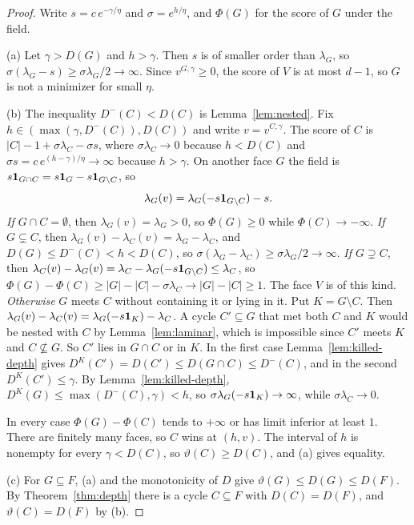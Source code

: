 \begin{proof}
Write $s=c\,e^{-\gamma/\eta}$ and $\sigma=e^{h/\eta}$, and $\Phi(G)$ for the score of
$G$ under the field.

(a) Let $\gamma>D(G)$ and $h>\gamma$. Then $s$ is of smaller order than
$\lambda_G$, so $\sigma(\lambda_G-s)\ge\sigma\lambda_G/2\to\infty$. Since
$v^{G,\gamma}\ge0$, the score of $V$ is at most $d-1$, so $G$ is not a
minimizer for small $\eta$.

(b) The inequality $D^-(C)<D(C)$ is Lemma~\ref{lem:nested}. Fix
$h\in(\max(\gamma,D^-(C)),D(C))$ and write $v=v^{C,\gamma}$. The score of $C$ is
$|C|-1+\sigma\lambda_C-\sigma s$, where $\sigma\lambda_C\to0$ because $h<D(C)$ and
$\sigma s=c\,e^{(h-\gamma)/\eta}\to\infty$ because $h>\gamma$. On another face
$G$ the field is $s\mathbf{1}_{G\cap C}=s\mathbf{1}_G-s\mathbf{1}_{G\setminus C}$, so
\[
 \lambda_G(v)=\lambda_G(-s\mathbf{1}_{G\setminus C})-s .
\]
\emph{If $G\cap C=\emptyset$}, then $\lambda_G(v)=\lambda_G>0$, so $\Phi(G)\ge0$
while $\Phi(C)\to-\infty$.
\emph{If $G\subsetneq C$}, then $\lambda_G(v)-\lambda_C(v)=\lambda_G-\lambda_C$, and
$D(G)\le D^-(C)<h<D(C)$, so $\sigma(\lambda_G-\lambda_C)\ge\sigma\lambda_G/2\to\infty$.
\emph{If $G\supsetneq C$}, then
$\lambda_C(v)-\lambda_G(v)=\lambda_C-\lambda_G(-s\mathbf{1}_{G\setminus C})\le\lambda_C$, so
$\Phi(G)-\Phi(C)\ge|G|-|C|-\sigma\lambda_C\to|G|-|C|\ge1$. The face $V$ is of this
kind.
\emph{Otherwise} $G$ meets $C$ without containing it or lying in it. Put
$K=G\setminus C$. Then $\lambda_G(v)-\lambda_C(v)=\lambda_G(-s\mathbf{1}_K)-\lambda_C$. A
cycle $C'\subseteq G$ that met both $C$ and $K$ would be nested with $C$ by
Lemma~\ref{lem:laminar}, which is impossible since $C'$ meets $K$ and
$C\not\subseteq G$. So $C'$ lies in $G\cap C$ or in $K$. In the first case
Lemma~\ref{lem:killed-depth} gives $D^K(C')=D(C')\le D(G\cap C)\le D^-(C)$, and in
the second $D^K(C')\le\gamma$. By Lemma~\ref{lem:killed-depth},
$D^K(G)\le\max(D^-(C),\gamma)<h$, so $\sigma\lambda_G(-s\mathbf{1}_K)\to\infty$, while
$\sigma\lambda_C\to0$.

In every case $\Phi(G)-\Phi(C)$ tends to $+\infty$ or has limit inferior at
least $1$. There are finitely many faces, so $C$ wins at $(h,v)$. The interval
of $h$ is nonempty for every $\gamma<D(C)$, so $\vartheta(C)\ge D(C)$, and (a) gives
equality.

(c) For $G\subseteq F$, (a) and the monotonicity of $D$ give
$\vartheta(G)\le D(G)\le D(F)$. By Theorem~\ref{thm:depth} there is a cycle
$C\subseteq F$ with $D(C)=D(F)$, and $\vartheta(C)=D(F)$ by (b).
\end{proof}

